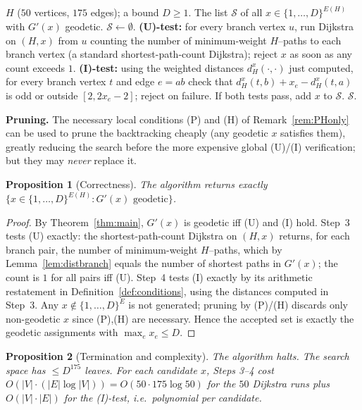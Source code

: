 \documentclass{amsart}
\newtheorem{proposition}{Proposition}
\theoremstyle{definition}
\begin{document}
\begin{algorithm}[H]
\caption{Enumerate geodetic homeomorphs of $H$ with $\max_e x_e\le D$}
\begin{algorithmic}[1]
\Require $H$ ($50$ vertices, $175$ edges); a bound $D\ge1$.
\Ensure The list $\mathcal S$ of all $x\in\{1,\dots,D\}^{E(H)}$ with $G'(x)$
geodetic.
\State $\mathcal S\gets\emptyset$.
  \State \textbf{(U)-test:} for every branch vertex $u$, run Dijkstra on
  $(H,x)$ from $u$ counting the number of minimum-weight $H$--paths to each
  branch vertex (a standard shortest-path-count Dijkstra); reject $x$ as soon as
  any count exceeds $1$.
  \State \textbf{(I)-test:} using the weighted distances $d^x_H(\cdot,\cdot)$
  just computed, for every branch vertex $t$ and edge $e=ab$ check that
  $d^x_H(t,b)+x_e-d^x_H(t,a)$ is odd or outside $[2,2x_e-2]$; reject on failure.
  \State If both tests pass, add $x$ to $\mathcal S$.
\EndFor
\State \Return $\mathcal S$.
\end{algorithmic}
\end{algorithm}

\noindent\textbf{Pruning.} The necessary local conditions (P) and (H) of
Remark~\ref{rem:PHonly} can be used to prune the backtracking cheaply (any
geodetic $x$ satisfies them), greatly reducing the search before the more
expensive global (U)/(I) verification; but they may \emph{never} replace it.

\begin{proposition}[Correctness]
The algorithm returns exactly $\{x\in\{1,\dots,D\}^{E(H)}:G'(x)\text{ geodetic}\}$.
\end{proposition}

\begin{proof}
By Theorem~\ref{thm:main}, $G'(x)$ is geodetic iff (U) and (I) hold. Step~3 tests
(U) exactly: the shortest-path-count Dijkstra on $(H,x)$ returns, for each branch
pair, the number of minimum-weight $H$--paths, which by Lemma~\ref{lem:distbranch}
equals the number of shortest paths in $G'(x)$; the count is $1$ for all pairs iff
(U). Step~4 tests (I) exactly by its arithmetic restatement in
Definition~\ref{def:conditions}, using the distances computed in Step~3. Any
$x\notin\{1,\dots,D\}^{E}$ is not generated; pruning by (P)/(H) discards only
non-geodetic $x$ since (P),(H) are necessary. Hence the accepted set is exactly
the geodetic assignments with $\max_e x_e\le D$.
\end{proof}

\begin{proposition}[Termination and complexity]
The algorithm halts. The search space has $\le D^{175}$ leaves. For each candidate
$x$, Steps 3--4 cost $O(|V|\cdot(|E|\log|V|))=O(50\cdot175\log50)$ for the $50$
Dijkstra runs plus $O(|V|\cdot|E|)$ for the (I)-test, i.e.\ polynomial per
candidate.
\end{proposition}
\end{document}
